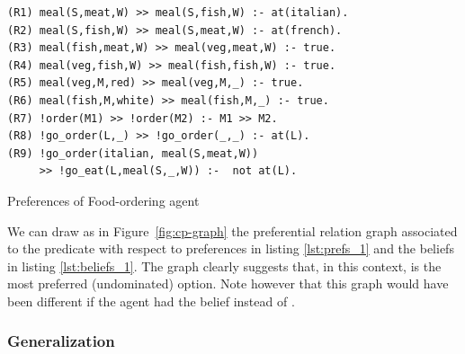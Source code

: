 
\begin{listing}[t]
\centering
\begin{tcolorbox}[left=2pt,right=2pt,top=2pt,bottom=2pt,arc=0pt,
                  boxrule=0pt,toprule=1pt,
                  colback=white]
\begin{verbatim}
(R1) meal(S,meat,W) >> meal(S,fish,W) :- at(italian).
(R2) meal(S,fish,W) >> meal(S,meat,W) :- at(french).
(R3) meal(fish,meat,W) >> meal(veg,meat,W) :- true.
(R4) meal(veg,fish,W) >> meal(fish,fish,W) :- true.
(R5) meal(veg,M,red) >> meal(veg,M,_) :- true.
(R6) meal(fish,M,white) >> meal(fish,M,_) :- true.
(R7) !order(M1) >> !order(M2) :- M1 >> M2.
(R8) !go_order(L,_) >> !go_order(_,_) :- at(L).
(R9) !go_order(italian, meal(S,meat,W)) 
     >> !go_eat(L,meal(S,_,W)) :-  not at(L).
\end{verbatim}
\end{tcolorbox}
    \caption{Preferences of Food-ordering agent}
    \label{lst:prefs_1}

\end{listing}

We can draw as in Figure~\ref{fig:cp-graph} the preferential relation graph associated to the predicate  with respect to preferences in listing \ref{lst:prefs_1} and the beliefs in listing \ref{lst:beliefs_1}. The graph clearly suggests that, in this context,  is the most preferred (undominated) option. Note however that this graph would have been different if the agent had the belief  instead of . %

\subsubsection{Generalization}

